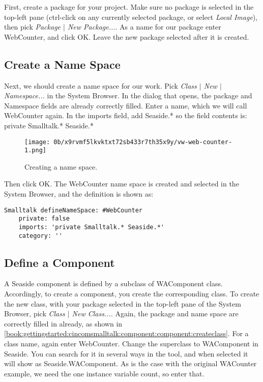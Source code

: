 \documentclass[a4paper,10pt,twoside]{book}
\newcommand{\ct}[1]{{\small\ttfamily\textup{#1}}}
\begin{document}
First, create a package for your project. Make sure no package is selected in the top-left pane (ctrl-click on any currently selected package, or select \textit{Local Image}), then pick \textit{Package $|$ New Package...}. As a name for our package enter WebCounter, and click OK. Leave the new package selected after it is created.

\subsection{Create a Name Space}
\label{book:gettingstarted:cincomsmalltalk:component:namespace}

Next, we should create a name space for our work. Pick \textit{Class $|$ New $|$ Namespace...} in the System Browser. In the dialog that opens, the package and Namespace fields are already correctly filled. Enter a name, which we will call WebCounter again. In the imports field, add \ct{Seaside.*} so the field contents is: \ct{private Smalltalk.* Seaside.*}

\begin{figure}[h!tbp]
	\begin{center}
		\texttt{[image: 0b/x9rvmf5lkvktxt72sb433r7th35x9y/vw-web-counter-1.png]}
		\caption{Creating a name space.\label{book:gettingstarted:cincomsmalltalk:component:namespace:namespace}}
	\end{center}
\end{figure}


Then click OK. The \ct{WebCounter} name space is created and selected in the System Browser, and the definition is shown as:

\begin{lstlisting}
Smalltalk defineNameSpace: #WebCounter 
    private: false 
    imports: 'private Smalltalk.* Seaside.*' 
    category: '' 
\end{lstlisting}

\subsection{Define a Component}
\label{book:gettingstarted:cincomsmalltalk:component:component}

A Seaside component is defined by a subclass of \ct{WAComponent} class. Accordingly, to create a component, you create the corresponding class. To create the new class, with your package selected in the top-left pane of the System Browser, pick \textit{Class $|$ New Class...}. Again, the package and name space are correctly filled in already, as shown in \autoref{book:gettingstarted:cincomsmalltalk:component:component:createclass}. For a class name, again enter \ct{WebCounter}. Change the superclass to \ct{WAComponent} in Seaside. You can search for it in several ways in the tool, and when selected it will show as \ct{Seaside.WAComponent}. As is the case with the original WACounter example, we need the one instance variable count, so enter that.
\end{document}
